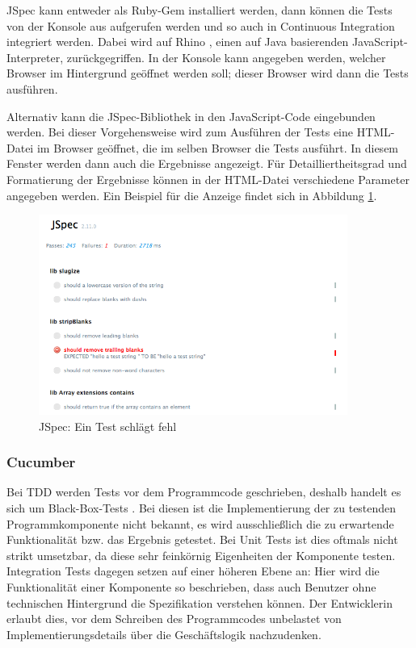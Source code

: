 JSpec kann entweder als Ruby-Gem installiert werden, dann können die Tests von der Konsole aus aufgerufen werden und so auch in Continuous Integration integriert werden. Dabei wird auf Rhino \cite{rhino:website}, einen auf Java basierenden JavaScript-Interpreter, zurückgegriffen. In der Konsole kann angegeben werden, welcher Browser im Hintergrund geöffnet werden soll; dieser Browser wird dann die Tests ausführen. 

Alternativ kann die JSpec-Bibliothek in den JavaScript-Code eingebunden werden. Bei dieser Vorgehensweise wird zum Ausführen der Tests eine HTML-Datei im Browser geöffnet, die im selben Browser die Tests ausführt. In diesem Fenster werden dann auch die Ergebnisse angezeigt. Für Detailliertheitsgrad und Formatierung der Ergebnisse können in der HTML-Datei verschiedene Parameter angegeben werden. Ein Beispiel für die Anzeige findet sich in  Abbildung \ref{fig:jspec-bad}.

\medskip
\begin{figure}[ht] 
  \begin{center}
    \includegraphics[width=0.9\textwidth]{grafik/jspec-example-bad} 
  \end{center}
  \caption{JSpec: Ein Test schlägt fehl}
  \label{fig:jspec-bad} 
\end{figure}



\subsubsection{Cucumber}
\label{subsec:cucumber}

Bei TDD werden Tests vor dem Programmcode geschrieben, deshalb handelt es sich um Black-Box-Tests \cite{beck:tdd}. Bei diesen ist die Implementierung der zu testenden Programmkomponente nicht bekannt, es wird ausschließlich die zu erwartende Funktionalität bzw. das Ergebnis getestet. Bei Unit Tests ist dies oftmals nicht strikt umsetzbar, da diese sehr feinkörnig Eigenheiten der Komponente testen. Integration Tests dagegen setzen auf einer höheren Ebene an: Hier wird die Funktionalität einer Komponente so beschrieben, dass auch Benutzer ohne technischen Hintergrund die Spezifikation verstehen können. Der Entwicklerin erlaubt dies, vor dem Schreiben des Programmcodes unbelastet von Implementierungsdetails über die Geschäftslogik nachzudenken. 

